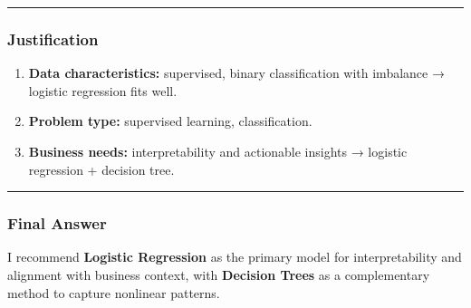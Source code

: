 \documentclass[
]{article}
\providecommand{\tightlist}{%
  \setlength{\itemsep}{0pt}\setlength{\parskip}{0pt}}
\begin{document}
\begin{center}\rule{0.5\linewidth}{0.5pt}\end{center}

\subsubsection{Justification}\label{justification}

\begin{enumerate}
\def\labelenumi{\arabic{enumi}.}
\tightlist
\item
  \textbf{Data characteristics:} supervised, binary classification with
  imbalance → logistic regression fits well.\\
\item
  \textbf{Problem type:} supervised learning, classification.\\
\item
  \textbf{Business needs:} interpretability and actionable insights →
  logistic regression + decision tree.
\end{enumerate}

\begin{center}\rule{0.5\linewidth}{0.5pt}\end{center}

\subsubsection{Final Answer}\label{final-answer-1}

I recommend \textbf{Logistic Regression} as the primary model for
interpretability and alignment with business context, with
\textbf{Decision Trees} as a complementary method to capture nonlinear
patterns.
\end{document}

